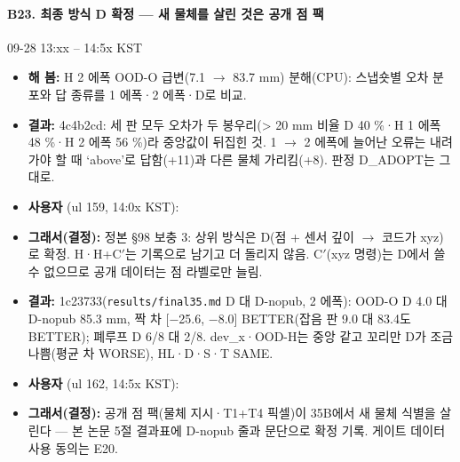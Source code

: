 \paragraph{B23. 최종 방식 D 확정 --- 새 물체를 살린 것은 공개 점 팩}
{\small 09-28 13:xx -- 14:5x KST}
\begin{itemize}
  \item \textbf{해 봄:} H 2 에폭 OOD-O 급변(7.1 $\rightarrow$ 83.7 mm) 분해(CPU): 스냅숏별 오차 분포와 답 종류를 1 에폭·2 에폭·D로 비교.
  \item \textbf{결과:} 4c4b2cd: 세 판 모두 오차가 두 봉우리(> 20 mm 비율 D 40 \%·H 1 에폭 48 \%·H 2 에폭 56 \%)라 중앙값이 뒤집힌 것. 1 $\rightarrow$ 2 에폭에 늘어난 오류는 내려가야 할 때 `above'로 답함(+11)과 다른 물체 가리킴(+8). 판정 D\_ADOPT는 그대로.
  \item \textbf{사용자} (ul 159, 14:0x KST): 
  \item \textbf{그래서(결정):} 정본 §98 보충 3: 상위 방식은 D(점 + 센서 깊이 $\rightarrow$ 코드가 xyz)로 확정. H·H+C$'$는 기록으로 남기고 더 돌리지 않음. C$'$(xyz 명령)는 D에서 쓸 수 없으므로 공개 데이터는 점 라벨로만 늘림.
  \item \textbf{결과:} 1c23733(\texttt{results/\allowbreak{}final35.\allowbreak{}md} D 대 D-nopub, 2 에폭): OOD-O D 4.0 대 D-nopub 85.3 mm, 짝 차 [$-$25.6, $-$8.0] BETTER(잡음 판 9.0 대 83.4도 BETTER); 폐루프 D 6/8 대 2/8. dev\_x·OOD-H는 중앙 같고 꼬리만 D가 조금 나쁨(평균 차 WORSE), HL·D·S·T SAME.
  \item \textbf{사용자} (ul 162, 14:5x KST): 
  \item \textbf{그래서(결정):} 공개 점 팩(물체 지시·T1+T4 픽셀)이 35B에서 새 물체 식별을 살린다 --- 본 논문 5절 결과표에 D-nopub 줄과 문단으로 확정 기록. 게이트 데이터 사용 동의는 E20.
\end{itemize}
